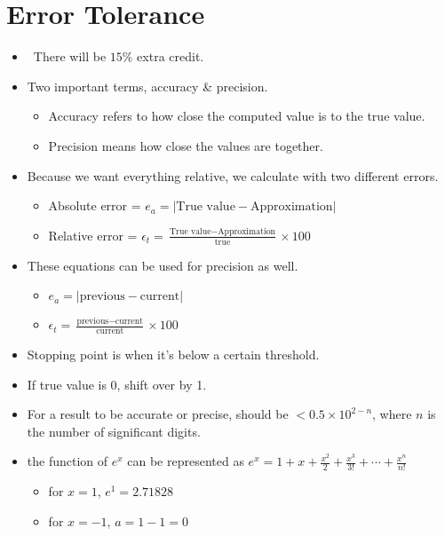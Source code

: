 \documentclass[12pt]{article}
\begin{document}
\section{Error Tolerance}

\begin{itemize}
    \item There will be $15\%$ extra credit.
    \item Two important terms, accuracy \& precision.
    \begin{itemize}
        \item Accuracy refers to how close the computed value is to the true value.
        \item Precision means how close the values are together.
    \end{itemize}

    \item Because we want everything relative, we calculate with two different errors.
    \begin{itemize}
        \item Absolute error = $e_a = |\text{True value} - \text{Approximation}|$
        \item Relative error = $\epsilon_t = \frac{\text{True value} - \text{Approximation}}{\text{true}} \times 100$
    \end{itemize}

    \item These equations can be used for precision as well.
    \begin{itemize}
        \item $e_a = |\text{previous} - \text{current}|$
        \item $\epsilon_t = \frac{\text{previous} - \text{current}}{\text{current}} \times 100$
    \end{itemize}

    \item Stopping point is when it's below a certain threshold.
    \item If true value is 0, shift over by 1.
    \item For a result to be accurate or precise, should be $< 0.5 \times 10^{2-n}$, where $n$ is the number of significant digits.

    \item the function of $e^x$ can be represented as $e^x = 1 + x + \frac{x^2}{2} + \frac{x^3}{3!} + \cdots + \frac{x^n}{n!}$
    \begin{itemize}
        \item for $x = 1$, $e^1 = 2.71828$
        \item for $x = -1$, $a = 1 - 1 = 0$
    \end{itemize}
\end{itemize}
\end{document}
